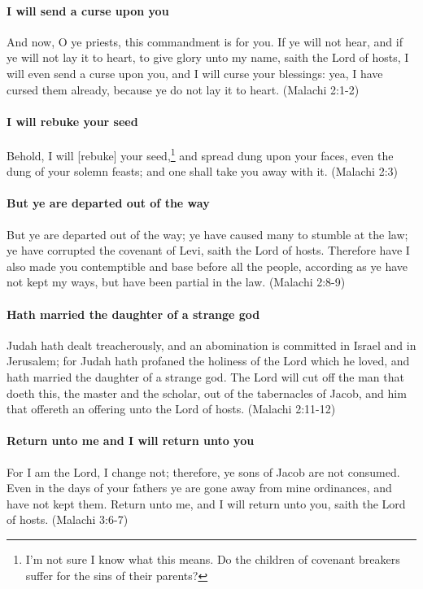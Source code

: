 \paragraph{I will send a curse upon you}
And now, O ye priests, this commandment is for you. If ye will not hear, and if ye will not lay it to heart, to give glory unto my name, saith the Lord of hosts, I will even send a curse upon you, and I will curse your blessings: yea, I have cursed them already, because ye do not lay it to heart. (Malachi 2:1-2)

\paragraph{I will rebuke your seed}
Behold, I will [rebuke] your seed,\footnote{I'm not sure I know what this means. Do the children of covenant breakers suffer for the sins of their parents?} and spread dung upon your faces, even the dung of your solemn feasts; and one shall take you away with it. (Malachi 2:3)

\paragraph{But ye are departed out of the way}
But ye are departed out of the way; ye have caused many to stumble at the law; ye have corrupted the covenant of Levi, saith the Lord of hosts. Therefore have I also made you contemptible and base before all the people, according as ye have not kept my ways, but have been partial in the law. (Malachi 2:8-9)

\paragraph{Hath married the daughter of a strange god}
Judah hath dealt treacherously, and an abomination is committed in Israel and in Jerusalem; for Judah hath profaned the holiness of the Lord which he loved, and hath married the daughter of a strange god. The Lord will cut off the man that doeth this, the master and the scholar, out of the tabernacles of Jacob, and him that offereth an offering unto the Lord of hosts. (Malachi 2:11-12)

\paragraph{Return unto me and I will return unto you}
For I am the Lord, I change not; therefore, ye sons of Jacob are not consumed. Even in the days of your fathers ye are gone away from mine ordinances, and have not kept them. Return unto me, and I will return unto you, saith the Lord of hosts. (Malachi 3:6-7)

